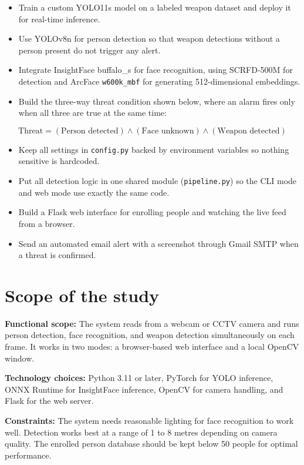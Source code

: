 \documentclass[12pt,a4paper]{report}
\begin{document}
\begin{itemize}
    \item Train a custom YOLO11s model on a labeled weapon dataset and deploy it for real-time inference.
    \item Use YOLOv8n for person detection so that weapon detections without a person present do not trigger any alert.
    \item Integrate InsightFace buffalo\_s for face recognition, using SCRFD-500M for detection and ArcFace \texttt{w600k\_mbf} for generating 512-dimensional embeddings.
    \item Build the three-way threat condition shown below, where an alarm fires only when all three are true at the same time:
\end{itemize}

\[
\text{Threat} = (\text{Person detected}) \land (\text{Face unknown}) \land (\text{Weapon detected})
\]

\begin{itemize}
    \item Keep all settings in \texttt{config.py} backed by environment variables so nothing sensitive is hardcoded.
    \item Put all detection logic in one shared module (\texttt{pipeline.py}) so the CLI mode and web mode use exactly the same code.
    \item Build a Flask web interface for enrolling people and watching the live feed from a browser.
    \item Send an automated email alert with a screenshot through Gmail SMTP when a threat is confirmed.
\end{itemize}

\section{Scope of the study}

\textbf{Functional scope:} The system reads from a webcam or CCTV camera and runs person detection, face recognition, and weapon detection simultaneously on each frame. It works in two modes: a browser-based web interface and a local OpenCV window.

\textbf{Technology choices:} Python 3.11 or later, PyTorch for YOLO inference, ONNX Runtime for InsightFace inference, OpenCV for camera handling, and Flask for the web server.

\textbf{Constraints:} The system needs reasonable lighting for face recognition to work well. Detection works best at a range of 1 to 8 metres depending on camera quality. The enrolled person database should be kept below 50 people for optimal performance.
\end{document}
